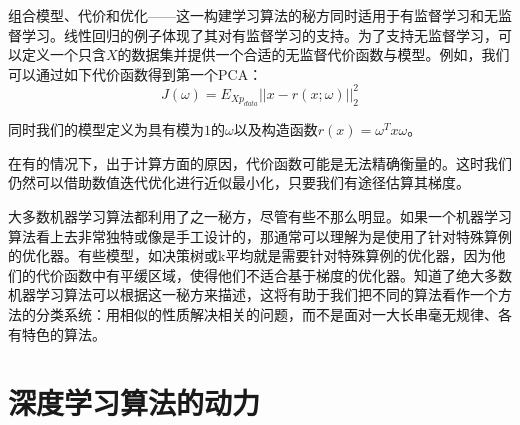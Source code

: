 组合模型、代价和优化——这一构建学习算法的秘方同时适用于有监督学习和无监督学习。线性回归的例子体现了其对有监督学习的支持。为了支持无监督学习，可以定义一个只含$X$的数据集并提供一个合适的无监督代价函数与模型。例如，我们可以通过如下代价函数得到第一个PCA：
\begin{equation}
	J(\omega) = E_{X p_{data}}||x - r(x;\omega)||_2^2
	\label{form:5.94}
\end{equation}

同时我们的模型定义为具有模为$1$的$\omega$以及构造函数$r(x)=\omega^Tx\omega$。

在有的情况下，出于计算方面的原因，代价函数可能是无法精确衡量的。这时我们仍然可以借助数值迭代优化进行近似最小化，只要我们有途径估算其梯度。

大多数机器学习算法都利用了之一秘方，尽管有些不那么明显。如果一个机器学习算法看上去非常独特或像是手工设计的，那通常可以理解为是使用了针对特殊算例的优化器。有些模型，如决策树或k平均就是需要针对特殊算例的优化器，因为他们的代价函数中有平缓区域，使得他们不适合基于梯度的优化器。知道了绝大多数机器学习算法可以根据这一秘方来描述，这将有助于我们把不同的算法看作一个方法的分类系统：用相似的性质解决相关的问题，而不是面对一大长串毫无规律、各有特色的算法。

\section{深度学习算法的动力}
\label{sec:5.11}

